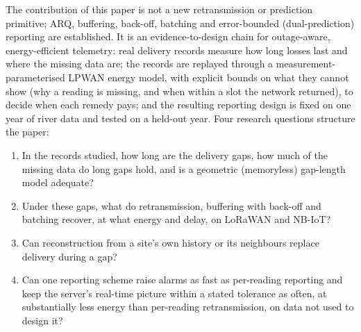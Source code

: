 The contribution of this paper is not a new retransmission or prediction primitive; ARQ, buffering, back-off, batching and error-bounded (dual-prediction) reporting are established. It is an evidence-to-design chain for outage-aware, energy-efficient telemetry: real delivery records measure how long losses last and where the missing data are; the records are replayed through a measurement-parameterised LPWAN energy model, with explicit bounds on what they cannot show (why a reading is missing, and when within a slot the network returned), to decide when each remedy pays; and the resulting reporting design is fixed on one year of river data and tested on a held-out year. Four research questions structure the paper:
\begin{enumerate}
\item[RQ1] In the records studied, how long are the delivery gaps, how much of the missing data do long gaps hold, and is a geometric (memoryless) gap-length model adequate?
\item[RQ2] Under these gaps, what do retransmission, buffering with back-off and batching recover, at what energy and delay, on LoRaWAN and NB-IoT?
\item[RQ3] Can reconstruction from a site's own history or its neighbours replace delivery during a gap?
\item[RQ4] Can one reporting scheme raise alarms as fast as per-reading reporting and keep the server's real-time picture within a stated tolerance as often, at substantially less energy than per-reading retransmission, on data not used to design it?
\end{enumerate}


